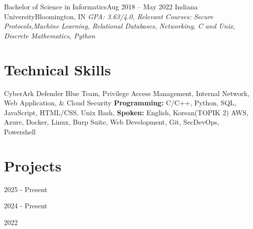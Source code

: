 \documentclass{resume}
\begin{document}
  \resumeEntryStart
    \resumeEntryTSDL
    {Bachelor of Science in Informatics}{Aug 2018 -- May 2022}
    {Indiana University}{Bloomington, IN}
      {\newline{}\newline{}\scriptsize \textit{ \footnotesize{GPA: 3.63/4.0, Relevant Courses: Secure Protocols,Machine Learning, Relational Databases, Networking, C and Unix, Discrete Mathematics, Python}}}
  \resumeEntryEnd

\section{Technical Skills}
 \resumeTechnicalEntryStart
   {CyberArk Defender}
   {Blue Team, Privilege Access Management, Internal Network, Web Application, \& Cloud Security}
   {\textbf{Programming:} C/C++, Python, SQL, JavaScript, HTML/CSS, Unix Bash, \textbf{Spoken:} English, Korean(TOPIK 2)}
   {AWS, Azure, Docker, Linux, Burp Suite, Web Development, Git, SecDevOps, Powershell}
  \resumeTechnicalEntryEnd

\section{Projects}
  \resumeProjectEntryStart
    \resumeEntryTD
      {\passmeter}{2025 - Present}
    \resumeItemListStart
    \resumeItemListEnd
  \resumeProjectEntryEnd 
  
  \resumeProjectEntryStart
    \resumeEntryTD
      {\potionprogramming}{2024 - Present}
    \resumeItemListStart
    \resumeItemListEnd
  \resumeProjectEntryEnd

  \resumeProjectEntryStart
    \resumeEntryTD
      {\rowhammerattackresearch}{2022}
    \resumeItemListStart  
    \resumeItemListEnd  
  \resumeProjectEntryEnd  
\end{document}
